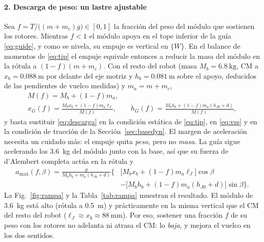\paragraph{2. Descarga de peso: un lastre ajustable}
Sea $f=T/\big((m+m_c)g\big)\in[0,1]$ la fracción del peso del módulo que sostienen los rotores. Mientras $f<1$ el módulo apoya en el tope inferior de la guía \eqref{eq:guide}, y como se nivela, su empuje es vertical en $\{W\}$. En el balance de momentos de \eqref{eq:tip} el empuje equivale entonces a reducir la masa del módulo en la rótula a $(1-f)(m+m_c)$. Con el resto del robot (masa $M_b=\SI{6.8}{\kilo\gram}$, CM a $x_b=\SI{0.088}{\metre}$ por delante del eje motriz y $h_b=\SI{0.081}{\metre}$ sobre el apoyo, deducidos de las pendientes de vuelco medidas) y $m_a=m+m_c$,
\begin{equation}
\begin{gathered}
  M(f)=M_b+(1-f)m_a,\\
  x_G(f)=\frac{M_bx_b+(1-f)m_a\ell_J}{M(f)},\qquad
  h_G(f)=\frac{M_bh_b+(1-f)m_a(h_{J0}+d)}{M(f)},
\end{gathered}
  \label{eq:descarga}
\end{equation}
y basta sustituir \eqref{eq:descarga} en la condición estática de \eqref{eq:tip}, en \eqref{eq:vss} y en la condición de tracción de la Sección~\ref{sec:basedyn}. El margen de aceleración necesita un cuidado más: el empuje quita \emph{peso}, pero no \emph{masa}. La guía sigue acelerando los \SI{3.6}{\kilo\gram} del módulo junto con la base, así que su fuerza de d'Alembert completa actúa en la rótula y
\begin{equation}
\begin{split}
  a_{\max}(f,\beta)=\frac{g}{M_bh_b+m_a(h_{J0}+d)}\Big\{&\big[M_bx_b+(1-f)m_a\ell_J\big]\cos\beta\\
  &-\big[M_bh_b+(1-f)m_a(h_{J0}+d)\big]\sin\beta\Big\}.
\end{split}
  \label{eq:amaxf}
\end{equation} La Fig.~\ref{fig:rampa} y la Tabla~\ref{tab:rampa} muestran el resultado. El módulo de \SI{3.6}{\kilo\gram} está alto (rótula a \SI{0.5}{\metre}) y prácticamente en la misma vertical que el CM del resto del robot ($\ell_J\approx x_b\approx\SI{88}{\milli\metre}$). Por eso, sostener una fracción $f$ de su peso con los rotores no adelanta ni atrasa el CM: lo \emph{baja}, y mejora el vuelco en los dos sentidos.
